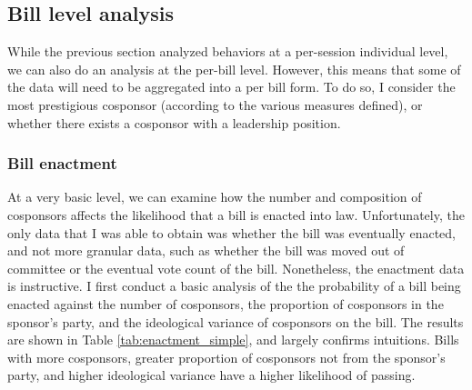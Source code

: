 \documentclass{article}
\begin{document}
  \subsection{Bill level analysis}
  While the previous section analyzed behaviors at a per-session individual level, we can also do an analysis at the per-bill level. However, this means that some of the data will need to be aggregated into a per bill form. To do so, I consider the most prestigious cosponsor (according to the various measures defined), or whether there exists a cosponsor with a leadership position. 

  \subsubsection{Bill enactment}
  At a very basic level, we can examine how the number and composition of cosponsors affects the likelihood that a bill is enacted into law. Unfortunately, the only data that I was able to obtain was whether the bill was eventually enacted, and not more granular data, such as whether the bill was moved out of committee or the eventual vote count of the bill. Nonetheless, the enactment data is instructive. I first conduct a basic analysis of the the probability of a bill being enacted against the number of cosponsors, the proportion of cosponsors in the sponsor's party, and the ideological variance of cosponsors on the bill. The results are shown in Table \ref{tab:enactment_simple}, and largely confirms intuitions. Bills with more cosponsors, greater proportion of cosponsors not from the sponsor's party, and higher ideological variance have a higher likelihood of passing.
\end{document}
